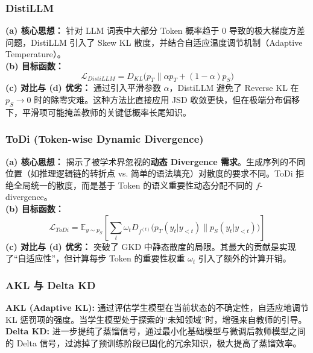 \documentclass{article}
\begin{document}
\subsubsection{DistiLLM \cite{ko2024distilllm}}
\textbf{(a) 核心思想：} 针对 LLM 词表中大部分 Token 概率趋于 0 导致的极大梯度方差问题，DistiLLM 引入了 Skew KL 散度，并结合自适应温度调节机制（Adaptive Temperature）。\\
\textbf{(b) 目标函数：}
\begin{equation}
    \mathcal{L}_{DistiLLM} = D_{KL}\big(p_T \parallel \alpha p_T + (1-\alpha) p_S\big)
\end{equation}
\textbf{(c) 对比与 (d) 优劣：} 通过引入平滑参数 $\alpha$，DistiLLM 避免了 Reverse KL 在 $p_S \to 0$ 时的除零灾难。这种方法比直接应用 JSD 收敛更快，但在极端分布偏移下，平滑项可能掩盖教师的关键低概率长尾知识。

\subsubsection{ToDi (Token-wise Dynamic Divergence) \cite{2505.16297}}
\textbf{(a) 核心思想：} 揭示了被学术界忽视的\textbf{动态 Divergence 需求}。生成序列的不同位置（如推理逻辑链的转折点 vs. 简单的语法填充）对散度的要求不同。ToDi 拒绝全局统一的散度，而是基于 Token 的语义重要性动态分配不同的 $f$-divergence。\\
\textbf{(b) 目标函数：} 
\begin{equation}
    \mathcal{L}_{ToDi} = \mathbb{E}_{y \sim p_S} \left[ \sum_t \omega_t D_{f^{(t)}} \big( p_T(y_t|y_{<t}) \parallel p_S(y_t|y_{<t}) \big) \right]
\end{equation}
\textbf{(c) 对比与 (d) 优劣：} 突破了 GKD 中静态散度的局限。其最大的贡献是实现了“自适应性”，但计算每步 Token 的重要性权重 $\omega_t$ 引入了额外的计算开销。

\subsubsection{AKL 与 Delta KD \cite{2410.14425, 2509.14526}}
\textbf{AKL (Adaptive KL):} 通过评估学生模型在当前状态的不确定性，自适应地调节 KL 惩罚项的强度。当学生模型处于探索的“未知领域”时，增强来自教师的引导。\\
\textbf{Delta KD:} 进一步提纯了蒸馏信号，通过最小化基础模型与微调后教师模型之间的 Delta 信号，过滤掉了预训练阶段已固化的冗余知识，极大提高了蒸馏效率。
\end{document}

